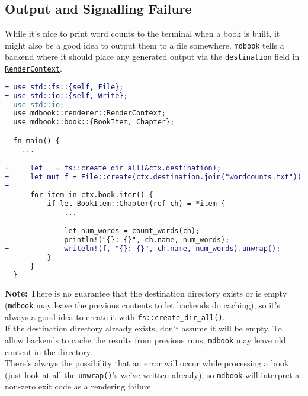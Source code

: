 \documentclass{article}
\begin{document}
\subsection{Output and Signalling Failure}
\label{Output and Signalling Failure}
\label{output-and-signalling-failure}

While it's nice to print word counts to the terminal when a book is built, it
might also be a good idea to output them to a file somewhere. \lstinline|mdbook| tells a
backend where it should place any generated output via the \lstinline|destination| field
in \href{https://docs.rs/mdbook/*/mdbook/renderer/struct.RenderContext.html}{\lstinline|RenderContext|}.\\
\begin{lstlisting}[language=diff]
+ use std::fs::{self, File};
+ use std::io::{self, Write};
- use std::io;
  use mdbook::renderer::RenderContext;
  use mdbook::book::{BookItem, Chapter};

  fn main() {
    ...

+     let _ = fs::create_dir_all(&ctx.destination);
+     let mut f = File::create(ctx.destination.join("wordcounts.txt")).unwrap();
+
      for item in ctx.book.iter() {
          if let BookItem::Chapter(ref ch) = *item {
              ...

              let num_words = count_words(ch);
              println!("{}: {}", ch.name, num_words);
+             writeln!(f, "{}: {}", ch.name, num_words).unwrap();
          }
      }
  }

\end{lstlisting}

\textbf{Note:} There is no guarantee that the destination directory exists or is
empty (\lstinline|mdbook| may leave the previous contents to let backends do caching),
so it's always a good idea to create it with \lstinline|fs::create_dir_all()|.\\

If the destination directory already exists, don't assume it will be empty.
To allow backends to cache the results from previous runs, \lstinline|mdbook| may leave
old content in the directory.\\

There's always the possibility that an error will occur while processing a book
(just look at all the \lstinline|unwrap()|'s we've written already), so \lstinline|mdbook| will
interpret a non-zero exit code as a rendering failure.\\
\end{document}
